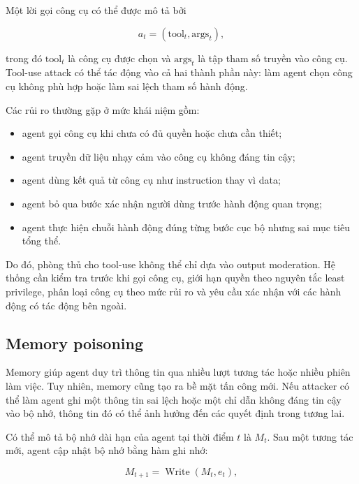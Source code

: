 Một lời gọi công cụ có thể được mô tả bởi

\begin{equation}
    a_t = (\mathrm{tool}_t, \mathrm{args}_t),
    \label{eq:tool-call}
\end{equation}

trong đó $\mathrm{tool}_t$ là công cụ được chọn và $\mathrm{args}_t$ là tập
tham số truyền vào công cụ. Tool-use attack có thể tác động vào cả hai
thành phần này: làm agent chọn công cụ không phù hợp hoặc làm sai lệch tham
số hành động.

Các rủi ro thường gặp ở mức khái niệm gồm:

\begin{itemize}[leftmargin=1.2cm]
    \item agent gọi công cụ khi chưa có đủ quyền hoặc chưa cần thiết;
    \item agent truyền dữ liệu nhạy cảm vào công cụ không đáng tin cậy;
    \item agent dùng kết quả từ công cụ như instruction thay vì data;
    \item agent bỏ qua bước xác nhận người dùng trước hành động quan trọng;
    \item agent thực hiện chuỗi hành động đúng từng bước cục bộ nhưng sai
    mục tiêu tổng thể.
\end{itemize}

Do đó, phòng thủ cho tool-use không thể chỉ dựa vào output moderation.
Hệ thống cần kiểm tra trước khi gọi công cụ, giới hạn quyền theo nguyên tắc
least privilege, phân loại công cụ theo mức rủi ro và yêu cầu xác nhận với
các hành động có tác động bên ngoài.

\subsection{Memory poisoning}
\label{subsec:memory-poisoning}

Memory giúp agent duy trì thông tin qua nhiều lượt tương tác hoặc nhiều
phiên làm việc. Tuy nhiên, memory cũng tạo ra bề mặt tấn công mới. Nếu
attacker có thể làm agent ghi một thông tin sai lệch hoặc một chỉ dẫn không
đáng tin cậy vào bộ nhớ, thông tin đó có thể ảnh hưởng đến các quyết định
trong tương lai.

Có thể mô tả bộ nhớ dài hạn của agent tại thời điểm $t$ là $M_t$. Sau một
tương tác mới, agent cập nhật bộ nhớ bằng hàm ghi nhớ:

\begin{equation}
    M_{t+1}
    =
    \operatorname{Write}(M_t, e_t),
    \label{eq:memory-update}
\end{equation}

